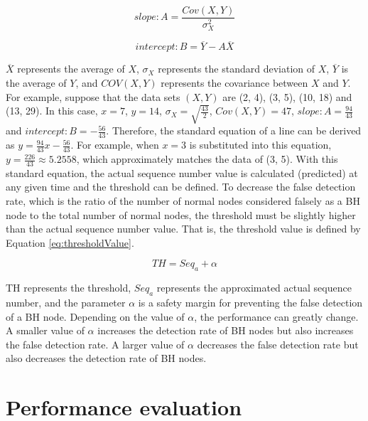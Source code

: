 \documentclass[conference]{IEEEtran}
\begin{document}
\begin{equation}
\label{eq:slope}
slope:A= \frac{Cov (X,Y)}{\sigma^2_X}
\end{equation}

\begin{equation}
\label{eq:intercept}
intercept:B=\overline{Y}-A\overline{X}
\end{equation}

$\overline{X}$ represents the average of $X$, $\sigma_X$ represents the standard deviation of $X$,  $\overline{Y}$ is the average of $Y$, and $COV (X,Y)$ represents the covariance between $X$ and $Y$. For example, suppose that the data sets $(X,Y)$ are (2, 4), (3, 5), (10, 18) and (13, 29). In this case, $x = 7$, $y = 14$, $\sigma_X=\sqrt{\displaystyle \frac{43}{2}}$, $Cov(X,Y)=47$, $slope:A=\displaystyle \frac{94}{43}$ and $intercept:B=\displaystyle -\frac{56}{43}$. Therefore, the standard equation of a line can be derived as $y=\displaystyle \frac{94}{43}x-\displaystyle \frac{56}{43}$. For example, when $x=3$ is substituted into this equation, $y=\displaystyle \frac{226}{43} \approx 5.2558$, which approximately matches the data of (3, 5). With this standard equation, the actual sequence number value is calculated (predicted) at any given time and the threshold can be defined. To decrease the false detection rate, which is the ratio of the number of normal nodes considered falsely as a BH node to the total number of normal nodes, the threshold must be slightly higher than the actual sequence number value. That is, the threshold value is defined by Equation \ref{eq:thresholdValue}.

\begin{equation}
\label{eq:thresholdValue}
TH = Seq_a + \alpha
\end{equation}

TH represents the threshold, $Seq_a$ represents the approximated actual sequence number, and the parameter $\alpha$ is a safety margin for preventing the false detection of a BH node. Depending on the value of $\alpha$, the performance can greatly change. A smaller value of $\alpha$ increases the detection rate of BH nodes but also increases the false detection rate. A larger value of $\alpha$ decreases the false detection rate but also decreases the detection rate of BH nodes. 

\section{Performance evaluation}
\label{evaluation}
\end{document}
